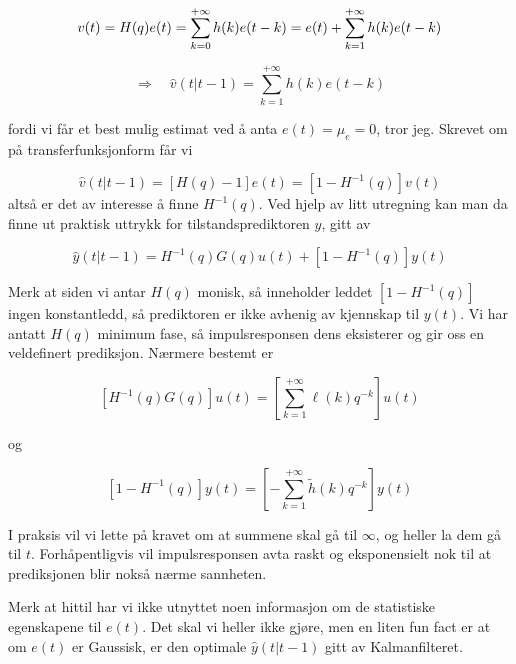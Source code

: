 \begin{equation}
v(t)=H(q) e(t)=\sum_{k=0}^{+\infty} h(k) e(t-k)=e(t)+\sum_{k=1}^{+\infty} h(k) e(t-k) \\
\end{equation}

\begin{equation}
\Longrightarrow \quad \widehat{v}(t | t-1)=\sum_{k=1}^{+\infty} h(k) e(t-k)
\end{equation}

fordi vi får et best mulig estimat ved å anta $e(t) = \mu_e = 0$, tror jeg. Skrevet om på transferfunksjonform får vi

\begin{equation}
	\hat{v}(t | t-1) = [H(q) - 1] e(t) = [1 - H^{-1}(q)] v(t)
\end{equation}
altså er det av interesse å finne $H^{-1}(q)$. Ved hjelp av litt utregning kan man da finne ut praktisk uttrykk for tilstandsprediktoren $\hat{y}$, gitt av

\begin{equation}
	\hat{y}(t | t-1) = H^{-1}(q) G(q) u(t) + [1 - H^{-1}(q)] y(t)
	\label{eq:predictor}
\end{equation}

Merk at siden vi antar $H(q)$ monisk, så inneholder leddet $[1 - H^{-1}(q)]$ ingen konstantledd, så prediktoren er ikke avhenig av kjennskap til $y(t)$. Vi har antatt $H(q)$ minimum fase, så impulsresponsen dens eksisterer og gir oss en veldefinert prediksjon. Nærmere bestemt er

\begin{equation}
	\left[H^{-1}(q) G(q)\right] u(t)=\left[\sum_{k=1}^{+\infty} \ell(k) q^{-k}\right] u(t)
\end{equation}

og

\begin{equation}
	\left[1-H^{-1}(q)\right] y(t)=\left[-\sum_{k=1}^{+\infty} \widetilde{h}(k) q^{-k}\right] y(t)
\end{equation}

I praksis vil vi lette på kravet om at summene skal gå til $\infty$, og heller la dem gå til $t$. Forhåpentligvis vil impulsresponsen avta raskt og eksponensielt nok til at prediksjonen blir nokså nærme sannheten.

Merk at hittil har vi ikke utnyttet noen informasjon om de statistiske egenskapene til $e(t)$. Det skal vi heller ikke gjøre, men en liten fun fact er at om $e(t)$ er Gaussisk, er den optimale $\hat{y}(t | t-1)$ gitt av Kalmanfilteret.

